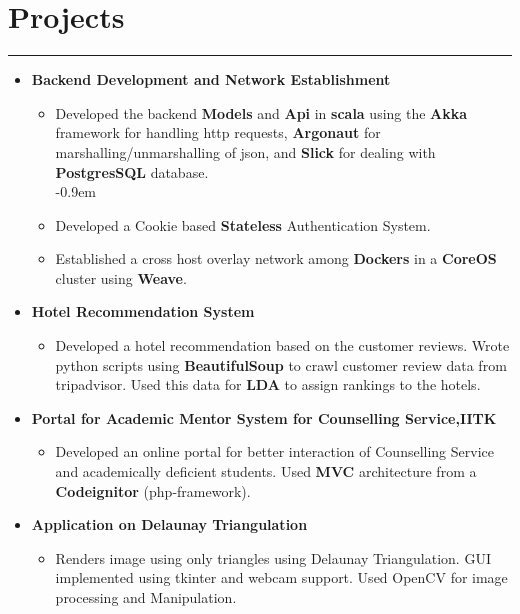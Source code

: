 \documentclass[a4paper]{article}
\begin{document}
\section*{Projects}
\hrule
\vspace{3mm}
  \begin{itemize}
  \item
   \textbf{Backend Development and Network Establishment}
  \begin{itemize}
          \textit{under Prof. Manindra Agarwal}
      \item Developed the backend \textbf{Models} and \textbf{Api} in \textbf{scala} using the \textbf{Akka} framework
          for handling http requests, \textbf{Argonaut} for marshalling/unmarshalling of json,
          and \textbf{Slick} for dealing with \textbf{PostgresSQL} database.\\
       \itemsep-0.9em
       \item Developed a Cookie based \textbf{Stateless} Authentication System.\\
       \item Established a cross host overlay network among \textbf{Dockers} in a \textbf{CoreOS}
           cluster using \textbf{Weave}.
    \end{itemize}
   \item 
    \textbf{Hotel Recommendation System}
	   \begin{itemize}
	    \item Developed a hotel recommendation based on the customer reviews.
            Wrote python scripts using \textbf{BeautifulSoup} to crawl customer review data from tripadvisor.
            Used this data for \textbf{LDA} to assign rankings to the hotels.
	   \end{itemize}
    \item
    \textbf{Portal for Academic Mentor System for Counselling Service,IITK}
	   \begin{itemize}
	    \item Developed an online portal for better interaction of Counselling 
            Service and academically deficient students. Used \textbf{MVC} architecture 
            from a \textbf{Codeignitor} (php-framework).
	   \end{itemize}
    \item
      \textbf{Application on Delaunay  Triangulation}
	\begin{itemize}
	 \item Renders image using only triangles using Delaunay Triangulation. GUI implemented using tkinter
         and webcam support. Used OpenCV for image processing and Manipulation.
	\end{itemize}
  \end{itemize}
\end{document}
